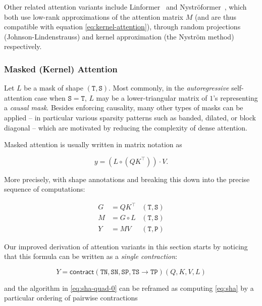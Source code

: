 Other related attention variants include Linformer~\citep{wang2020linformer} and Nystr\"{o}former~\citep{xiong2021nystromformer}, which both use low-rank approximations of the attention matrix $M$ (and are thus compatible with equation \eqref{eq:kernel-attention}), through random projections (Johnson-Lindenstrauss) and kernel approximation (the Nystr\"{o}m method) respectively.

\subsubsection{Masked (Kernel) Attention}

Let $L$ be a mask of shape $\mathtt{(T,S)}$.
Most commonly, in the \emph{autoregressive} self-attention case when $\mathtt{S}=\mathtt{T}$,
$L$ may be a lower-triangular matrix of $1$'s representing a \emph{causal mask}. Besides enforcing causality, many other types of masks can be applied -- in particular various sparsity patterns such as banded, dilated, or block diagonal -- which are motivated by reducing the complexity of dense attention. 

Masked attention is usually written in matrix notation as

\begin{equation}
  \label{eq:sha-quad-matrix}
  y = (L \circ (QK^\top)) \cdot V
  .
\end{equation}

More precisely, with shape annotations and breaking this down into the precise sequence of computations:

\begin{equation}
  \label{eq:sha-quad-0}
  \begin{aligned}
    G &= QK^\top & \mathtt{(T,S)} \\
    M &= G \circ L & \mathtt{(T,S)} \\
    Y &= M V & \mathtt{(T,P)}
  \end{aligned}
\end{equation}

Our improved derivation of attention variants in this section starts by noticing that this formula can be written as a \emph{single contraction}:

\begin{equation}
  \label{eq:sha}
  Y = \mathsf{contract}(\mathtt{TN},\mathtt{SN},\mathtt{SP},\mathtt{TS} \to \mathtt{TP})(Q, K, V, L)
\end{equation}

and the algorithm in \eqref{eq:sha-quad-0} can be reframed as computing \eqref{eq:sha} by a particular ordering of pairwise contractions

